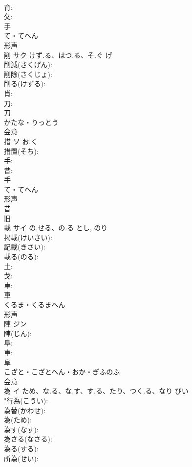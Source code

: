 \documentclass[8pt]{extreport}
\begin{document}
\begin{CJK}{UTF8}{min}
\\	育: 
\\	攵: 
\\	手	
\\	て・てへん	
\\	形声 
\\	削	サク	けず.る、はつ.る、そ.ぐ	げ	
\\	削減(さくげん): 
\\	削除(さくじょ): 
\\	削る(けずる): 
\\	肖: 
\\	刀: 
\\	刀	
\\	かたな・りっとう	
\\	会意 
\\	措	ソ	お.く		
\\	措置(そち): 
\\	手: 
\\	昔: 
\\	手	
\\	て・てへん	
\\	形声 
\\	昔 
\\	旧 
\\	載	サイ	の.せる、の.る	とし, のり	
\\	掲載(けいさい): 
\\	記載(きさい): 
\\	載る(のる): 
\\	土: 
\\	戈: 
\\	車: 
\\	車	
\\	くるま・くるまへん	
\\	形声 
\\	陣	ジン			
\\	陣(じん): 
\\	阜: 
\\	車: 
\\	阜	
\\	こざと・こざとへん・おか・ぎふのふ	
\\	会意 
\\	為	イ	ため、な.る、な.す、す.る、たり、つく.る、なり	びい	
\\	"行為(こうい): 
\\	為替(かわせ): 
\\	為(ため): 
\\	為す(なす): 
\\	為さる(なさる): 
\\	為る(する): 
\\	所為(せい): 

\end{CJK}
\end{document}
